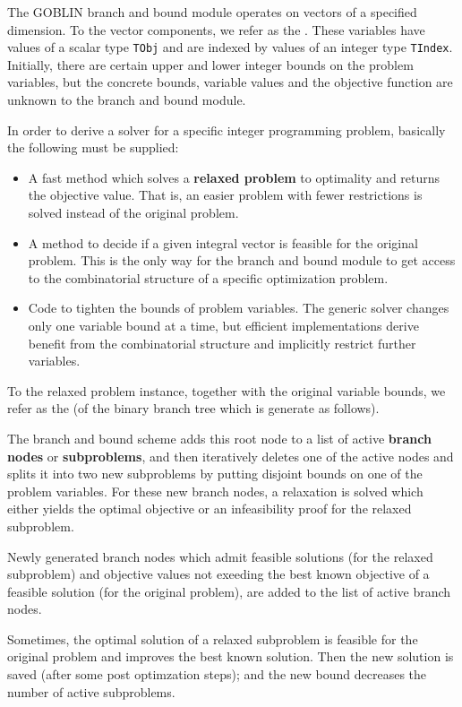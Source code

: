 \documentclass[a4paper,11pt,twoside]{book}
\begin{document}
\begin{multicols}{2}
The GOBLIN branch and bound module operates on vectors of a specified dimension.
To the vector components, we refer as the . These
variables have values of a scalar type \verb/TObj/ and are indexed
by values of an integer type \verb/TIndex/. Initially, there are certain
upper and lower integer bounds on the problem variables, but the concrete
bounds, variable values and the objective function are unknown to the branch
and bound module.

In order to derive a solver for a specific integer programming problem,
basically the following must be supplied:
\begin{itemize}
\item A fast method which solves a {\bf relaxed problem}
     to optimality and returns the objective value.
    That is, an easier problem with fewer restrictions is solved instead of
    the original problem.
\item A method to decide if a given integral vector is feasible for the
    original problem. This is the only way for the branch and bound module to
    get access to the combinatorial structure of a specific optimization
    problem.
\item Code to tighten the bounds of problem variables. The generic solver
    changes only one variable bound at a time, but efficient implementations
    derive benefit from the combinatorial structure and implicitly restrict
    further variables.
\end{itemize}
To the relaxed problem instance, together with the original variable bounds,
we refer as the  (of the binary branch tree which is generate as
follows).

The branch and bound scheme adds this root node to a list of active
{\bf branch nodes} or {\bf subproblems},
and then iteratively deletes one of the active nodes and splits it into two
new subproblems by putting disjoint bounds on one of the problem variables.
For these new branch nodes, a relaxation is solved which either yields the
optimal objective or an infeasibility proof for the relaxed subproblem.

Newly generated branch nodes which admit feasible solutions (for the relaxed
subproblem) and objective values not exeeding the best known objective of a
feasible solution (for the original problem), are added to the list of active
branch nodes.

Sometimes, the optimal solution of a relaxed subproblem is feasible for the
original problem and improves the best known solution. Then the new solution
is saved (after some post optimzation steps); and the new bound decreases the
number of active subproblems.


\end{multicols}
\end{document}
